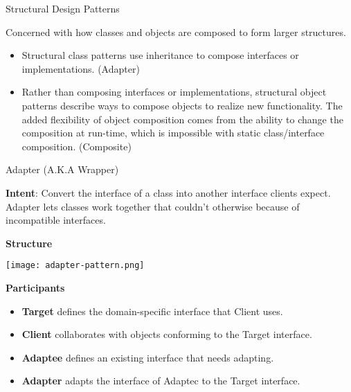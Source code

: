 \documentclass{beamer}
\author[Chris Simpkins] 
{Christopher Simpkins \\\texttt{chris.simpkins@gatech.edu}}
\institute[Georgia Tech] %
\date[CS 1331]{}
\begin{document}
\begin{frame}
  \titlepage
\end{frame}

\begin{frame}[fragile]{Structural Design Patterns}


Concerned with how classes and objects are composed to form larger structures.

\begin{itemize}
\item  Structural class patterns use inheritance to compose interfaces or implementations. (Adapter)
\item Rather than composing interfaces or implementations, structural object patterns describe ways to compose objects to realize new functionality. The added flexibility of object composition comes from the ability to change the composition at run-time, which is impossible with static class/interface composition. (Composite)
\end{itemize}


\end{frame}

\begin{frame}[fragile]{Adapter (A.K.A Wrapper)}



{\bf Intent}: Convert the interface of a class into another interface clients expect. Adapter lets classes work together that couldn't otherwise because of incompatible interfaces.

{\bf Structure}
\vspace{-.05in}
\begin{center}
\texttt{[image: adapter-pattern.png]}\\
\end{center}
\vspace{-.125in}
{\bf Participants}
\begin{itemize}
\item {\bf Target} defines the domain-specific interface that Client uses.
\item {\bf Client} collaborates with objects conforming to the Target interface.
\item {\bf Adaptee} defines an existing interface that needs adapting.
\item {\bf Adapter} adapts the interface of Adaptec to the Target interface.
\end{itemize}


\end{frame}
\end{document}
